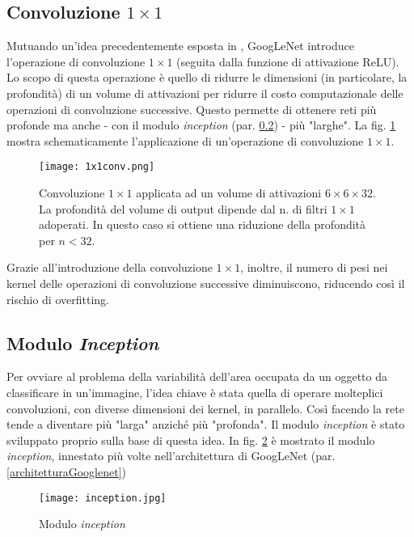 \subsection{Convoluzione $1\times 1$}
\label{1x1conv}
Mutuando un'idea precedentemente esposta in \cite{NiN}, GoogLeNet introduce l'operazione di convoluzione $1\times 1$ (seguita dalla funzione di attivazione ReLU). Lo scopo di questa operazione è quello di ridurre le dimensioni (in particolare, la profondità) di un volume di attivazioni per ridurre il costo computazionale delle operazioni di convoluzione successive. Questo permette di ottenere reti più profonde ma anche - con il modulo \textit{inception} (par. \ref{inception}) - più "larghe".
La fig. \ref{fig:1x1conv} mostra schematicamente l'applicazione di un'operazione di convoluzione $1\times 1$.

\begin{figure}[h] 
\centering
\texttt{[image: 1x1conv.png]}
\caption{Convoluzione $1\times 1$ applicata ad un volume di attivazioni $6\times 6\times 32$. La profondità del volume di output dipende dal n. di filtri $1\times 1$ adoperati. In questo caso si ottiene una riduzione della profondità per $n<32$.}
\label{fig:1x1conv}
\end{figure}

Grazie all'introduzione della convoluzione $1\times 1$, inoltre, il numero di pesi nei kernel delle operazioni di convoluzione successive diminuiscono, riducendo così il rischio di overfitting.

\subsection{Modulo \textit{Inception}}
\label{inception}
Per ovviare al problema della variabilità dell'area occupata da un oggetto da classificare in un'immagine, l'idea chiave è stata quella di operare molteplici convoluzioni, con diverse dimensioni dei kernel, in parallelo.
Così facendo la rete tende a diventare più "larga" anziché più "profonda".
Il modulo \textit{inception} è stato sviluppato proprio sulla base di questa idea.
In fig. \ref{fig:inception} è mostrato il modulo \textit{inception}, innestato più volte nell'architettura di GoogLeNet (par. \ref{architetturaGooglenet})

\begin{figure}[h] 
\centering
\texttt{[image: inception.jpg]}
\caption{Modulo \textit{inception}}
\label{fig:inception}
\end{figure}

